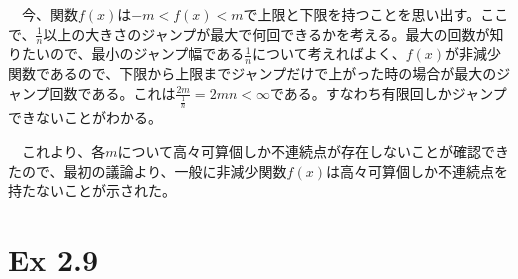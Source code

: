 \documentclass{article}
\begin{document}
　今、関数$f(x)$は$-m < f(x) < m$で上限と下限を持つことを思い出す。ここで、$\frac{1}{n}$以上の大きさのジャンプが最大で何回できるかを考える。最大の回数が知りたいので、最小のジャンプ幅である$\frac{1}{n}$について考えればよく、$f(x)$が非減少関数であるので、下限から上限までジャンプだけで上がった時の場合が最大のジャンプ回数である。これは$\frac{2m}{\frac{1}{n}} = 2mn < \infty$である。すなわち有限回しかジャンプできないことがわかる。

　これより、各$m$について高々可算個しか不連続点が存在しないことが確認できたので、最初の議論より、一般に非減少関数$f(x)$は高々可算個しか不連続点を持たないことが示された。

\section{Ex 2.9}
\end{document}
